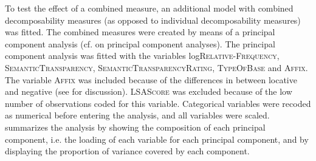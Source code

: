 To test the effect of a combined  measure, an additional model with combined decomposability measures (as opposed to individual decomposability measures) was fitted. The combined measures were created by means of a principal component analysis (cf.  on principal component analyses). 
The principal component analysis was fitted with the variables log\textsc{Relative-Frequency}, \textsc{SemanticTransparency}, \textsc{SemanticTransparencyRating}, \textsc{TypeOfBase} and \textsc{Affix}. The variable \textsc{Affix} was included because of the differences in  between locative and negative  (see  for discussion). \textsc{LSAScore} was excluded because of the low number of observations coded for this variable. Categorical variables were recoded as numerical before entering the analysis, and all variables were scaled.
 summarizes the analysis by showing the composition of each principal component, i.e. the loading of each variable for each principal component, and by displaying the proportion of variance covered by each component. 


